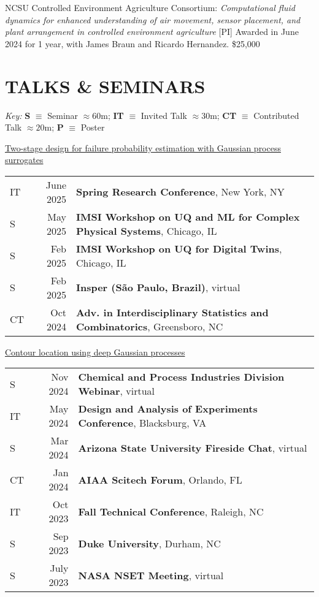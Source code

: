 \documentclass[margin,line,11pt]{res}
\begin{document}
\begin{resume}
NCSU Controlled Environment Agriculture Consortium: {\it Computational fluid dynamics for
enhanced understanding of air movement, sensor placement, and plant arrangement in controlled
environment agriculture} [PI] Awarded in June 2024 for 1 year, with James Braun and 
Ricardo Hernandez. \hfill \$25,000

\medskip
\section{\bf TALKS \& SEMINARS}
{\em Key:}
{\bf S} $\equiv$ Seminar $\approx60$m;
{\bf IT} $\equiv$ Invited Talk $\approx30$m;
{\bf CT} $\equiv$ Contributed Talk $\approx20$m; 
{\bf P} $\equiv$ Poster %

\underline{Two-stage design for failure probability estimation with Gaussian process surrogates}\\
\begin{tabular}{lrl}
IT\quad\quad & June 2025 & {\bf Spring Research Conference}, New York, NY \\
S\quad\quad & May 2025 & {\bf IMSI Workshop on UQ and ML for Complex Physical Systems}, Chicago, IL \\
S\quad\quad & Feb 2025 & {\bf IMSI Workshop on UQ for Digital Twins}, Chicago, IL \\
S\quad\quad & Feb 2025 & {\bf Insper (S\~ao Paulo, Brazil)}, virtual \\
CT\quad\quad & Oct 2024 & {\bf Adv. in Interdisciplinary Statistics and Combinatorics}, Greensboro, NC \\
\end{tabular}

\underline{Contour location using deep Gaussian processes}\\
\begin{tabular}{lrl}
S\quad\quad & Nov 2024 & {\bf Chemical and Process Industries Division Webinar}, virtual \\
IT\quad\quad & May 2024 & {\bf Design and Analysis of Experiments Conference}, Blacksburg, VA \\
S\quad\quad & Mar 2024 & {\bf Arizona State University Fireside Chat}, virtual \\
CT\quad\quad & Jan 2024 & {\bf AIAA Scitech Forum}, Orlando, FL \\
IT\quad\quad & Oct 2023 & {\bf Fall Technical Conference}, Raleigh, NC \\
S\quad\quad & Sep 2023 & {\bf Duke University}, Durham, NC \\ 
S\quad\quad & July 2023 & {\bf NASA NSET Meeting}, virtual \\
\end{tabular}


\end{resume}
\end{document}
